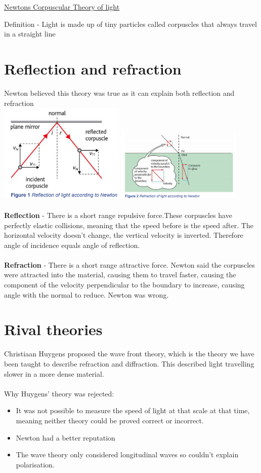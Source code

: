 \documentclass[12pt]{article}
\begin{document}
\begin{center}
\underline{\huge Newton\textquotesingle s Corpuscular Theory of light}
\end{center}
Definition - Light is made up of tiny particles called corpuscles that always travel in a straight line
\section{Reflection and refraction}
Newton believed this theory was true as it can explain both reflection and refraction\\
\includegraphics[width=6cm]{reflection.png}
\includegraphics[width=6cm]{refraction.png}\\
\\
\textbf{Reflection} - There is a short range repulsive force.These corpuscles have perfectly elastic collisions, meaning that the speed before is the speed after. The horizontal velocity doesn't change, the vertical velocity is inverted. Therefore angle of incidence equals angle of reflection.\\
\\
\textbf{Refraction} - There is a short range attractive force. Newton said the corpuscles were attracted into the material, causing them to travel faster, causing the component of the velocity perpendicular to the boundary to increase, causing angle with the normal to reduce. Newton was wrong.
\section{Rival theories}
Christiaan Huygens proposed the wave front theory, which is the theory we have been taught to describe refraction and diffraction. This described light travelling slower in a more dense material.\\
\\
Why Huygens' theory was rejected:
\begin{itemize}
\item It was not possible to measure the speed of light at that scale at that time, meaning neither theory could be proved correct or incorrect.
\item Newton had a better reputation
\item The wave theory only considered longitudinal waves so couldn't explain polarisation.
\end{itemize}
\end{document}
